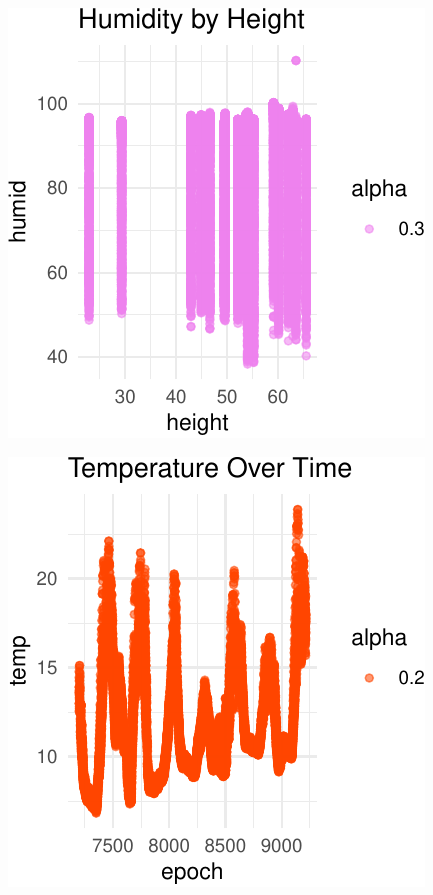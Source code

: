 \documentclass[]{article}
\begin{document}
\begin{center}\includegraphics{Project1WriteUp_files/figure-latex/unnamed-chunk-13-2} \end{center}

\begin{center}\includegraphics{Project1WriteUp_files/figure-latex/unnamed-chunk-13-3} \end{center}
\end{document}
